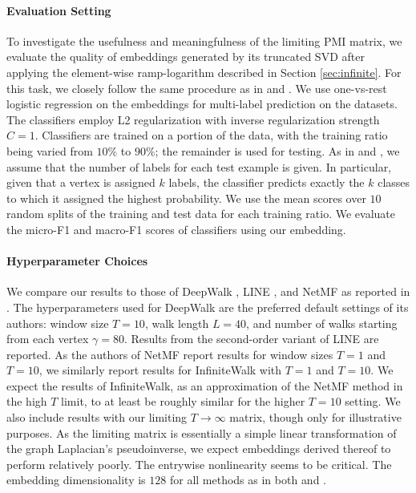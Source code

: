 \documentclass[sigconf]{acmart}
\begin{document}
\paragraph{Evaluation Setting} To investigate the usefulness and meaningfulness of the limiting PMI matrix, we evaluate the quality of embeddings generated by its truncated SVD after applying the element-wise ramp-logarithm described in Section \ref{sec:infinite}. For this task, we closely follow the same procedure as in \cite{perozzi2014deepwalk} and \cite{qiu2018network}. We use one-vs-rest logistic regression on the embeddings for multi-label prediction on the datasets. The classifiers employ L2  regularization with inverse regularization strength $C=1$. Classifiers are trained on a portion of the data, with the training ratio being varied from $10\%$ to $90\%$; the remainder is used for testing. As in \cite{perozzi2014deepwalk} and \cite{qiu2018network}, we assume that the number of labels for each test example is given. In particular, given that a vertex is assigned $k$ labels, the classifier predicts exactly the $k$ classes to which it assigned the highest probability. We use the mean scores over $10$ random splits of the training and test data for each training ratio. We evaluate the micro-F1 and macro-F1 scores of classifiers using our embedding.

\paragraph{Hyperparameter Choices} We compare our results to those of DeepWalk \cite{perozzi2014deepwalk}, LINE \cite{tang2015line}, and NetMF \cite{qiu2018network} as reported in \cite{qiu2018network}. The hyperparameters used for DeepWalk are the preferred default settings of its authors: window size $T=10$, walk length $L=40$, and number of walks starting from each vertex $\gamma=80$. Results from the second-order variant of LINE are reported. As the authors of NetMF report results for window sizes $T=1$ and $T=10$, we similarly report results for InfiniteWalk with $T=1$ and $T=10$. We expect the results of InfiniteWalk, as an approximation of the NetMF method in the high $T$ limit, to at least be roughly similar for the higher $T=10$ setting. We also include results with our limiting $T\rightarrow\infty$ matrix, though only for illustrative purposes. As the limiting matrix is essentially a simple linear transformation of the graph Laplacian's pseudoinverse, we expect embeddings derived thereof to perform relatively poorly. The entrywise nonlinearity seems to be critical. The embedding dimensionality is $128$ for all methods as in both \cite{perozzi2014deepwalk} and \cite{qiu2018network}. 
% 
% 
\end{document}
